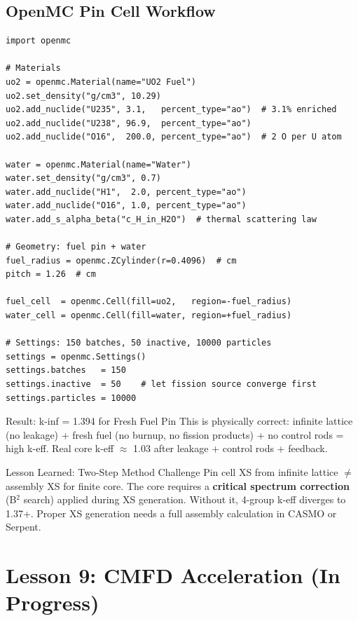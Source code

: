 \documentclass[12pt,a4paper]{article}
\begin{document}
\subsection{OpenMC Pin Cell Workflow}

\begin{lstlisting}[caption={OpenMC PWR Pin Cell Setup}]
import openmc

# Materials
uo2 = openmc.Material(name="UO2 Fuel")
uo2.set_density("g/cm3", 10.29)
uo2.add_nuclide("U235", 3.1,   percent_type="ao")  # 3.1% enriched
uo2.add_nuclide("U238", 96.9,  percent_type="ao")
uo2.add_nuclide("O16",  200.0, percent_type="ao")  # 2 O per U atom

water = openmc.Material(name="Water")
water.set_density("g/cm3", 0.7)
water.add_nuclide("H1",  2.0, percent_type="ao")
water.add_nuclide("O16", 1.0, percent_type="ao")
water.add_s_alpha_beta("c_H_in_H2O")  # thermal scattering law

# Geometry: fuel pin + water
fuel_radius = openmc.ZCylinder(r=0.4096)  # cm
pitch = 1.26  # cm

fuel_cell  = openmc.Cell(fill=uo2,   region=-fuel_radius)
water_cell = openmc.Cell(fill=water, region=+fuel_radius)

# Settings: 150 batches, 50 inactive, 10000 particles
settings = openmc.Settings()
settings.batches   = 150
settings.inactive  = 50    # let fission source converge first
settings.particles = 10000
\end{lstlisting}

\begin{lessonbox}{Result: k-inf = 1.394 for Fresh Fuel Pin}
This is physically correct: infinite lattice (no leakage) + fresh fuel
(no burnup, no fission products) + no control rods = high k-eff.
Real core k-eff $\approx$ 1.03 after leakage + control rods + feedback.
\end{lessonbox}

\begin{warnbox}{Lesson Learned: Two-Step Method Challenge}
Pin cell XS from infinite lattice $\neq$ assembly XS for finite core.
The core requires a \textbf{critical spectrum correction} (B$^2$ search)
applied during XS generation. Without it, 4-group k-eff diverges to 1.37+.
Proper XS generation needs a full assembly calculation in CASMO or Serpent.
\end{warnbox}

\section{Lesson 9: CMFD Acceleration (In Progress)}
\end{document}
